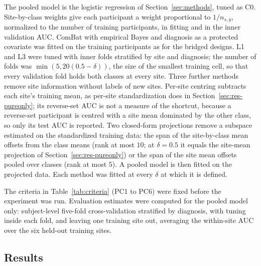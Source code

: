 The pooled model is the logistic regression of Section~\ref{sec:methods}, tuned as C0. Site-by-class weights give each participant a weight proportional to $1/n_{s,y}$, normalized to the number of training participants, in fitting and in the inner validation AUC. ComBat with empirical Bayes and diagnosis as a protected covariate was fitted on the training participants as for the bridged designs. L1 and L3 were tuned with inner folds stratified by site and diagnosis; the number of folds was $\min(5,20(0.5-\delta))$, the size of the smallest training cell, so that every validation fold holds both classes at every site. Three further methods remove site information without labels of new sites. Per-site centring subtracts each site's training mean, as per-site standardization does in Section~\ref{sec:res-pureonly}; its reverse-set AUC is not a measure of the shortcut, because a reverse-set participant is centred with a site mean dominated by the other class, so only its test AUC is reported. Two closed-form projections remove a subspace estimated on the standardized training data: the span of the site-by-class mean offsets from the class means (rank at most $10$; at $\delta=0.5$ it equals the site-mean projection of Section~\ref{sec:res-pureonly}) or the span of the site mean offsets pooled over classes (rank at most $5$). A pooled model is then fitted on the projected data. Each method was fitted at every $\delta$ at which it is defined.

The criteria in Table~\ref{tab:criteria} (PC1 to PC6) were fixed before the experiment was run. Evaluation estimates were computed for the pooled model only: subject-level five-fold cross-validation stratified by diagnosis, with tuning inside each fold, and leaving one training site out, averaging the within-site AUC over the six held-out training sites.

\subsection{Results}

